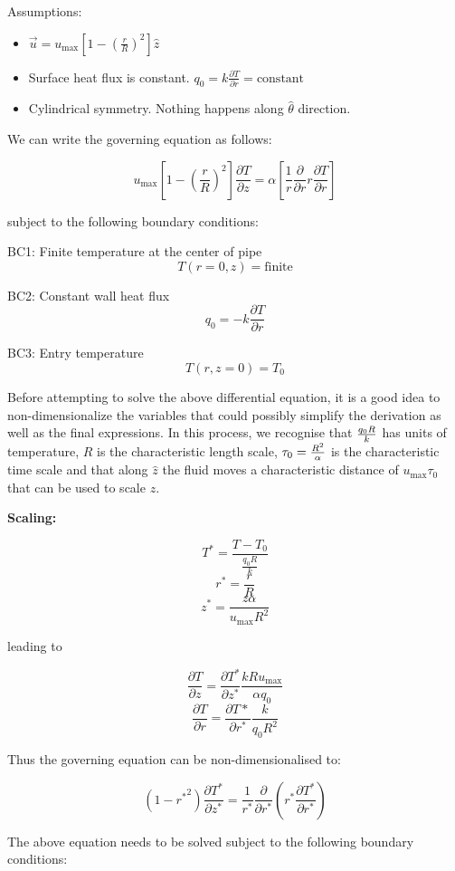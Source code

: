 \newcommand{\umax}{u_{\text{max}}}
Assumptions:
\begin{itemize}
\item $\vec{u} = \umax \left[ 1 - \left( \frac{r}{R} \right)^2 \right] \hat{z}$
\item Surface heat flux is constant. $q_0 = k \frac{\partial T}{\partial r} = \text{constant}$
\item Cylindrical symmetry. Nothing happens along $\hat{\theta}$ direction.
\end{itemize}

We can write the governing equation as follows:

$$
\umax \left[ 1 - \left( \frac{r}{R} \right)^2 \right] \frac{\partial T}{\partial z} = \alpha \left[ \frac{1}{r} \frac{\partial}{\partial r} r \frac{\partial T}{\partial r} \right]
$$

subject to the following boundary conditions:

BC1: Finite temperature at the center of pipe $$T(r=0, z) = \text{finite}$$

BC2: Constant wall heat flux $$ q_0 = -k \frac{\partial T}{\partial r} $$

BC3: Entry temperature $$T(r, z=0) = T_0$$

Before attempting to solve the above differential equation, it is a good idea to non-dimensionalize the variables that could possibly simplify the derivation as well as the final expressions. In this process, we recognise that $q_0 R \over k$ has units of temperature, $R$ is the characteristic length scale, $\tau_0 = { R^2 \over \alpha}$ is the characteristic time scale and that along $\hat{z}$ the fluid moves a characteristic distance of $\umax \tau_0$ that can be used to scale $z$.


{\bf Scaling:}

$$T^* = \frac{T-T_0}{\frac{q_0 R}{k}}$$
$$r^* = \frac{r}{R}$$
$$z^* = \frac{z \alpha}{\umax R^2}$$

leading to 

$$\frac{\partial T}{\partial z} = \frac{\partial T^*}{\partial z^*} \frac{k R \umax}{\alpha q_0}$$
$$\frac{\partial T}{\partial r} = \frac{\partial T*}{\partial r^*} \frac{k}{q_0 R^2}$$

Thus the governing equation can be non-dimensionalised to:

$$
(1 - {r^*}^2) \frac{\partial T^*}{\partial z^*} = \frac{1}{r^*} \frac{\partial}{\partial r^*} \left( r^* \frac{\partial T^*}{\partial r^*} \right) 
$$

The above equation needs to be solved subject to the following boundary conditions:

